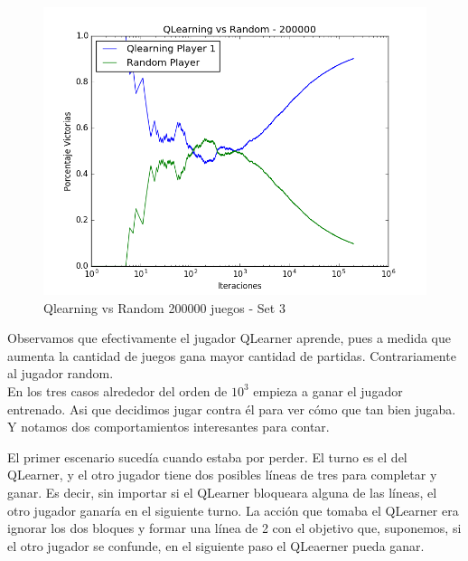 \begin{figure}[h]
 \centering
 \begin{minipage}{.45\textwidth}
	\centering
	\includegraphics[scale=0.35]{img1/QlearningVsRandom_200000_6x5_cyntia.png}
        \caption{Qlearning vs Random 200000 juegos - Set 3}
  \end{minipage}
\end{figure}

 

Observamos que efectivamente el jugador QLearner aprende, pues a medida que aumenta la cantidad de juegos gana mayor cantidad de partidas. Contrariamente al jugador random.  \\

En los tres casos alrededor del orden de $10^{3}$ empieza a ganar el jugador entrenado. 
Asi que decidimos jugar contra él para ver c\'omo que tan bien jugaba. Y notamos dos comportamientos interesantes para contar.

El primer escenario suced\'ia cuando estaba por perder. El turno es el del QLearner, y el otro jugador tiene dos posibles l\'ineas de tres para completar y ganar. Es decir, sin importar si el QLearner bloqueara alguna de las l\'ineas, el otro jugador ganar\'ia en el siguiente turno. La acci\'on que tomaba el QLearner era ignorar los dos bloques y formar una l\'inea de 2 con el objetivo que, suponemos, si el otro jugador se confunde, en el siguiente paso el QLeaerner pueda ganar.  

